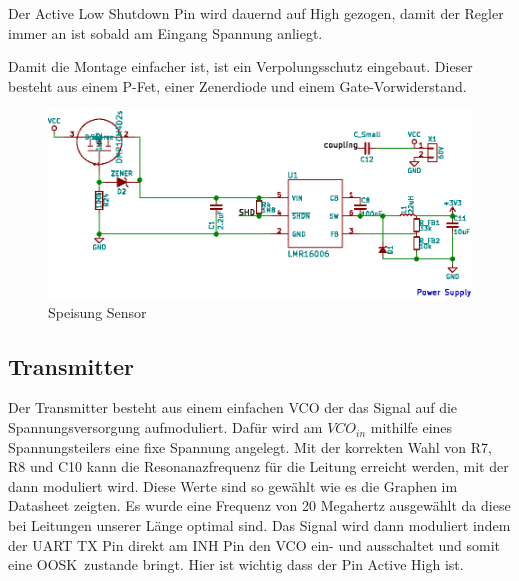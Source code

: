 Der Active Low Shutdown Pin wird dauernd auf High gezogen, damit der Regler immer an ist sobald am Eingang Spannung anliegt.

Damit die Montage einfacher ist, ist ein Verpolungsschutz eingebaut. Dieser besteht aus einem P-Fet, einer Zenerdiode und einem Gate-Vorwiderstand.

\begin{figure}[h!t]
    \centering
    \includegraphics[width=1\textwidth]{images/sensor-sch/sensor--sch--supply.eps}
    \caption[Sensor: Schema Speisung]{Speisung Sensor}
\end{figure}

\subsection{Transmitter}
\label{subsec:hw:sensor:transmitter}

Der Transmitter besteht aus einem einfachen VCO der das Signal auf die Spannungsversorgung aufmoduliert.
Dafür wird am $VCO_{in}$ mithilfe eines Spannungsteilers eine fixe Spannung angelegt. Mit der korrekten Wahl von R7, R8 und C10 kann die Resonanazfrequenz für die Leitung erreicht werden, mit der dann moduliert wird. Diese Werte sind so gewählt wie es die Graphen im Datasheet zeigten. Es wurde eine Frequenz von 20 Megahertz ausgewählt da diese bei Leitungen unserer Länge optimal sind.
Das Signal wird dann moduliert indem der UART TX Pin direkt am INH Pin den VCO ein- und ausschaltet und somit eine OOSK zustande bringt. Hier ist wichtig dass der Pin Active High ist.

